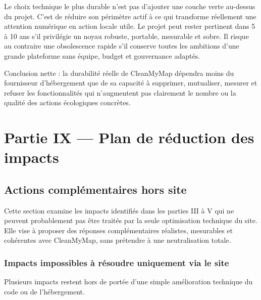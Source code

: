 \documentclass[
  10pt,
  a4paper,
  DIV=11,
  numbers=noendperiod,
  oneside]{scrreprt}
\begin{document}
Le choix technique le plus durable n'est pas d'ajouter une couche verte
au-dessus du projet. C'est de réduire son périmètre actif à ce qui
transforme réellement une attention numérique en action locale utile. Le
projet peut rester pertinent dans 5 à 10 ans s'il privilégie un noyau
robuste, portable, mesurable et sobre. Il risque au contraire une
obsolescence rapide s'il conserve toutes les ambitions d'une grande
plateforme sans équipe, budget et gouvernance adaptés.

Conclusion nette : la durabilité réelle de CleanMyMap dépendra moins du
fournisseur d'hébergement que de sa capacité à supprimer, mutualiser,
mesurer et refuser les fonctionnalités qui n'augmentent pas clairement
le nombre ou la qualité des actions écologiques concrètes.

\chapter{Partie IX --- Plan de réduction des
impacts}\label{partie-ix-plan-de-reduction-des-impacts}

\section{Actions complémentaires hors
site}\label{actions-compluxe9mentaires-hors-site}

Cette section examine les impacts identifiés dans les parties III à V
qui ne peuvent probablement pas être traités par la seule optimisation
technique du site. Elle vise à proposer des réponses complémentaires
réalistes, mesurables et cohérentes avec CleanMyMap, sans prétendre à
une neutralisation totale.

\subsection{Impacts impossibles à résoudre uniquement via le
site}\label{impacts-impossibles-uxe0-ruxe9soudre-uniquement-via-le-site}

Plusieurs impacts restent hors de portée d'une simple amélioration
technique du code ou de l'hébergement.
\end{document}
